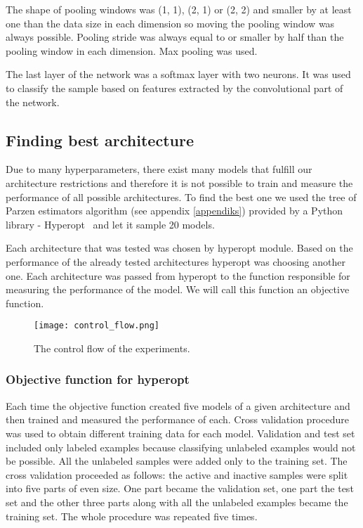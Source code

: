 \documentclass[a4paper,10pt]{report}
\begin{document}
      The shape of pooling windows was (1, 1), (2, 1) or (2, 2) and smaller by at least one than the data size in each dimension so moving the pooling window was always possible. Pooling stride was always equal to or smaller by half than the pooling window in each dimension. Max pooling was used. 
      
      The last layer of the network was a softmax layer with two neurons. It was used to classify the sample based on features extracted by the convolutional part of the network. 
      
	\subsection{Finding best architecture}
	Due to many hyperparameters, there exist many models that fulfill our architecture restrictions and therefore it is not possible to train and measure the performance of all possible architectures. To find the best one we used the tree of Parzen estimators algorithm (see appendix \ref{appendiks}) provided by a Python library - Hyperopt~\cite{HYPEROPT} and let it sample 20 models. 
		
	Each architecture that was tested was chosen by hyperopt module. Based on the performance of the already tested architectures hyperopt was choosing another one. Each architecture was passed from hyperopt to the function responsible for measuring the performance of the model. We will call this function an objective function. 
	
	 \begin{figure}[h!]
	  \centering
	  \texttt{[image: control\_flow.png]}
	  \caption{The control flow of the experiments.}
	  \label{fig:control_flow}
	\end{figure} 
	
	\subsubsection{Objective function for hyperopt}
	Each time the objective function created five models of a given architecture and then trained and measured the performance of each. Cross validation procedure was used to obtain different training data for each model. Validation and test set included only labeled examples because classifying unlabeled examples would not be possible. All the unlabeled samples were added only to the training set. The cross validation proceeded as follows: the active and inactive samples were split into five parts of even size. One part became the validation set, one part the test set and the other three parts along with all the unlabeled examples became the training set. The whole procedure was repeated five times. 
	
\end{document}
